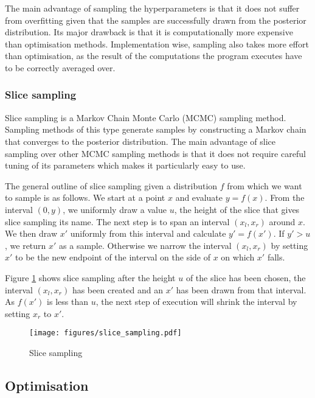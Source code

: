 \documentclass[a4paper,12pt,twoside,openright]{report}
\begin{document}

The main advantage of sampling the hyperparameters is that it does not suffer from overfitting given that the samples are successfully drawn from the posterior distribution. Its major drawback is that it is computationally more expensive than optimisation methods. Implementation wise, sampling also takes more effort than optimisation, as the result of the computations the program executes have to be correctly averaged over.

\subsubsection{Slice sampling}

Slice sampling \cite{MacKay:2002:ITI:971143, neal2003} is a Markov Chain Monte Carlo (MCMC) sampling method. Sampling methods of this type generate samples by constructing a Markov chain that converges to the posterior distribution. The main advantage of slice sampling over other MCMC sampling methods is that it does not require careful tuning of its parameters which makes it particularly easy to use. 

The general outline of slice sampling given a distribution $f$ from which we want to sample is as follows. We start at a point $x$ and evaluate $y = f(x)$. From the interval $(0, y)$, we uniformly draw a value $u$, the height of the slice that gives slice sampling its name. The next step is to span an interval $(x_l, x_r)$ around $x$. We then draw $x'$ uniformly from this interval and calculate $y' = f(x')$. If $y' > u$, we return $x'$ as a sample. Otherwise we narrow the interval $(x_l, x_r)$ by setting $x'$ to be the new endpoint of the interval on the side of $x$ on which $x'$ falls.

Figure \ref{slsamp} shows slice sampling after the height $u$ of the slice has been chosen, the interval $(x_l, x_r)$ has been created and an $x'$ has been drawn from that interval. As $f(x')$ is less than $u$, the next step of execution will shrink the interval by setting $x_r$ to $x'$.

\begin{figure}
\centering
  \texttt{[image: figures/slice\_sampling.pdf]}
  \caption{Slice sampling}
  \label{slsamp}
\end{figure}




\subsection{Optimisation}
\end{document}
